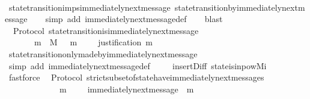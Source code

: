 \begin{isabellebody}
%
\isadelimproof
\ \ %
\endisadelimproof
%
\isatagproof
{}\isamarkupfalse%
\ state{\isacharunderscore}transition{\isacharunderscore}imps{\isacharunderscore}immediately{\isacharunderscore}next{\isacharunderscore}message\ state{\isacharunderscore}transition{\isacharunderscore}by{\isacharunderscore}immediately{\isacharunderscore}next{\isacharunderscore}message\isanewline
\ \ \isamarkupfalse%
\ {\isacharparenleft}simp\ add{\isacharcolon}\ immediately{\isacharunderscore}next{\isacharunderscore}message{\isacharunderscore}def{\isacharparenright}\isanewline
\ \ \isamarkupfalse%
\ blast%
\endisatagproof
{\isafoldproof}%
%
\isadelimproof
\isanewline
%
\endisadelimproof
\isanewline
{}\isamarkupfalse%
\ {\isacharparenleft}\ Protocol{\isacharparenright}\ state{\isacharunderscore}transition{\isacharunderscore}is{\isacharunderscore}immediately{\isacharunderscore}next{\isacharunderscore}message{\isacharcolon}\ \isanewline
\ \ {\isachardoublequoteopen}{\isasymforall}\ {\isasymsigma}\ {\isasymin}\ {\isasymSigma}{\isachardot}\ {\isasymforall}\ m\ {\isasymin}\ M{\isachardot}\ {\isasymsigma}\ {\isasymunion}\ {\isacharbraceleft}m{\isacharbraceright}\ {\isasymin}\ {\isasymSigma}\ \ {\isasymlongleftrightarrow}\ justification\ m\ {\isasymsubseteq}\ {\isasymsigma}{\isachardoublequoteclose}\isanewline
%
\isadelimproof
\ \ %
\endisadelimproof
%
\isatagproof
{}\isamarkupfalse%
\ state{\isacharunderscore}transition{\isacharunderscore}only{\isacharunderscore}made{\isacharunderscore}by{\isacharunderscore}immediately{\isacharunderscore}next{\isacharunderscore}message\ \isanewline
\ \ \isamarkupfalse%
\ {\isacharparenleft}simp\ add{\isacharcolon}\ immediately{\isacharunderscore}next{\isacharunderscore}message{\isacharunderscore}def{\isacharparenright}\ \isanewline
\ \ \isamarkupfalse%
\ insert{\isacharunderscore}Diff\ state{\isacharunderscore}is{\isacharunderscore}in{\isacharunderscore}pow{\isacharunderscore}Mi\ \isamarkupfalse%
\ fastforce%
\endisatagproof
{\isafoldproof}%
%
\isadelimproof
\isanewline
%
\endisadelimproof
\isanewline
\isanewline
{}\isamarkupfalse%
\ {\isacharparenleft}\ Protocol{\isacharparenright}\ strict{\isacharunderscore}subset{\isacharunderscore}of{\isacharunderscore}state{\isacharunderscore}have{\isacharunderscore}immediately{\isacharunderscore}next{\isacharunderscore}messages{\isacharcolon}\ \isanewline
\ \ {\isachardoublequoteopen}{\isasymforall}\ {\isasymsigma}\ {\isasymin}\ {\isasymSigma}{\isachardot}\ {\isasymforall}\ {\isasymsigma}{\isacharprime}{\isachardot}\ {\isasymsigma}{\isacharprime}\ {\isasymsubset}\ {\isasymsigma}\ {\isasymlongrightarrow}\ {\isacharparenleft}{\isasymexists}\ m\ {\isasymin}\ {\isasymsigma}\ {\isacharminus}\ {\isasymsigma}{\isacharprime}{\isachardot}\ immediately{\isacharunderscore}next{\isacharunderscore}message\ {\isacharparenleft}{\isasymsigma}{\isacharprime}{\isacharcomma}\ m{\isacharparenright}{\isacharparenright}{\isachardoublequoteclose}\isanewline

\end{isabellebody}
